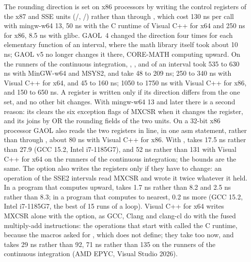 \documentclass[12pt,a4paper,twoside,openright]{book}
\begin{document}
\medskip
The rounding direction is set on x86 processors by writing the control
registers of the x87 and SSE units (/,
/) rather than through ,
which cost 130 ns per call with mingw-w64 13, 50 ns with the C runtime of
Visual C++ for x64 and 250 ns for x86, 8.5 ns with glibc.\newinvfive{} GAOL~4
changed the direction four times for each elementary function of an interval,
where the math library itself took about 10 ns; GAOL v5 no longer changes it
there, CORE-MATH computing upward. On the runners of the continuous
integration, , ,  and  of an
interval took 535 to 630 ns with MinGW-w64 and MSYS2, and take 48 to 209 ns;
250 to 340 ns with Visual C++ for x64, and 45 to 160 ns; 1050 to 1750 ns with
Visual C++ for x86, and 150 to 650 ns. A register is written only if its
direction differs from the one set, and no other bit changes. With mingw-w64
13 and later there is a second reason: its  clears the six
exception flags of MXCSR when it changes the register, and its
 joins by OR the rounding fields of the two units. On a
32-bit x86 processor GAOL also reads the two registers in line, in one asm
statement, rather than through , about 80 ns with Visual
C++ for x86. With ,  takes
17.5 ns rather than 27.9 (GCC 15.2, Intel i7-1185G7), and 52 ns rather than
131 with Visual C++ for x64 on the runners of the continuous integration;
the bounds are the same. The option also writes the registers only if they
have to change: an operation of the SSE2 intervals read MXCSR and wrote it
twice whatever it held. In a program that computes upward, 
takes 1.7 ns rather than 8.2 and  2.5 ns rather than 8.3; in a
program that computes to nearest, 0.2 ns more (GCC 15.2, Intel i7-1185G7, the
best of 15 runs of a loop). Visual C++ for x64 writes MXCSR alone with the
option, as GCC, Clang and clang-cl do with the fused multiply-add
instructions: the operations that start with  called
the C runtime, because the macros asked for , which
 does not define; they take  too now, and
 takes 29 ns rather than 92,  71 ns rather than
135 on the runners of the continuous integration (AMD EPYC, Visual Studio
2026).
\end{document}
